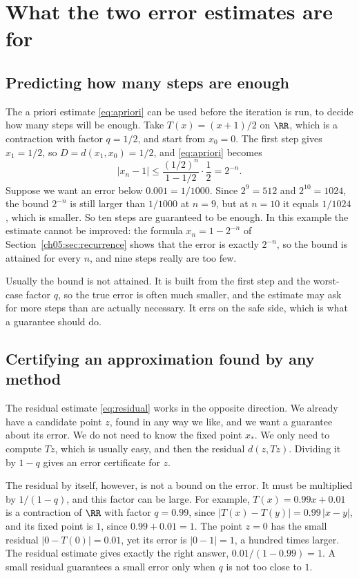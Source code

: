 \section{What the two error estimates are for}\label{ch12:sec:estimates}
\subsection*{Predicting how many steps are enough}
The a priori estimate \eqref{eq:apriori} can be used before the iteration is run, to decide how many steps will be enough. Take $T(x)=(x+1)/2$ on $\RR$, which is a contraction with factor $q=1/2$, and start from $x_0=0$. The first step gives $x_1=1/2$, so $D=d(x_1,x_0)=1/2$, and \eqref{eq:apriori} becomes
\[
|x_n-1|\le\frac{(1/2)^n}{1-1/2}\cdot\frac12=2^{-n}.
\]
Suppose we want an error below $0.001=1/1000$. Since $2^9=512$ and $2^{10}=1024$, the bound $2^{-n}$ is still larger than $1/1000$ at $n=9$, but at $n=10$ it equals $1/1024$, which is smaller. So ten steps are guaranteed to be enough. In this example the estimate cannot be improved: the formula $x_n=1-2^{-n}$ of Section~\ref{ch05:sec:recurrence} shows that the error is exactly $2^{-n}$, so the bound is attained for every $n$, and nine steps really are too few.

Usually the bound is not attained. It is built from the first step and the worst-case factor $q$, so the true error is often much smaller, and the estimate may ask for more steps than are actually necessary. It errs on the safe side, which is what a guarantee should do.

\subsection*{Certifying an approximation found by any method}
The residual estimate \eqref{eq:residual} works in the opposite direction. We already have a candidate point $z$, found in any way we like, and we want a guarantee about its error. We do not need to know the fixed point $x_*$. We only need to compute $Tz$, which is usually easy, and then the residual $d(z,Tz)$. Dividing it by $1-q$ gives an error certificate for $z$.

The residual by itself, however, is not a bound on the error. It must be multiplied by $1/(1-q)$, and this factor can be large. For example, $T(x)=0.99x+0.01$ is a contraction of $\RR$ with factor $q=0.99$, since $|T(x)-T(y)|=0.99\,|x-y|$, and its fixed point is $1$, since $0.99+0.01=1$. The point $z=0$ has the small residual $|0-T(0)|=0.01$, yet its error is $|0-1|=1$, a hundred times larger. The residual estimate gives exactly the right answer, $0.01/(1-0.99)=1$. A small residual guarantees a small error only when $q$ is not too close to $1$.

